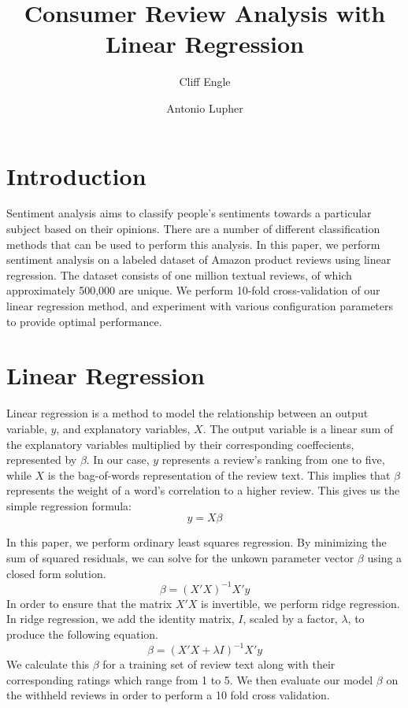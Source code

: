 \documentclass{article}
\title{Consumer Review Analysis with Linear Regression}
\author{Cliff Engle \and Antonio Lupher}
\begin{document}

\maketitle

\section{Introduction}
Sentiment analysis aims to classify people's sentiments towards a particular subject based on their opinions. There are a number of different classification methods that can be used to perform this analysis. In this paper, we perform sentiment analysis on a labeled dataset of Amazon product reviews using linear regression. The dataset consists of one million textual reviews, of which approximately 500,000 are unique. We perform 10-fold cross-validation of our linear regression method, and experiment with various configuration parameters to provide optimal performance.

\section{Linear Regression}
Linear regression is a method to model the relationship between an output variable, $y$, and explanatory variables, $X$. The output variable is a linear sum of the explanatory variables multiplied by their corresponding coeffecients, represented by $\beta$. In our case, $y$ represents a review's ranking from one to five, while $X$ is the bag-of-words representation of the review text. This implies that $\beta$ represents the weight of a word's correlation to a higher review. This gives us the simple regression formula: $$y=X\beta$$

In this paper, we perform ordinary least squares regression. By minimizing the sum of squared residuals, we can solve for the unkown parameter vector $\beta$ using a closed form solution. $$\beta=(X'X)^{-1}X'y$$ In order to ensure that the matrix $X'X$ is invertible, we perform ridge regression. In ridge regression, we add the identity matrix, $I$, scaled by a factor, $\lambda$, to produce the following equation. $$\beta=(X'X+\lambda I)^{-1}X'y$$ We calculate this $\beta$ for a training set of review text along with their corresponding ratings which range from 1 to 5. We then evaluate our model $\beta$ on the withheld reviews in order to perform a 10 fold cross validation.
\end{document}
